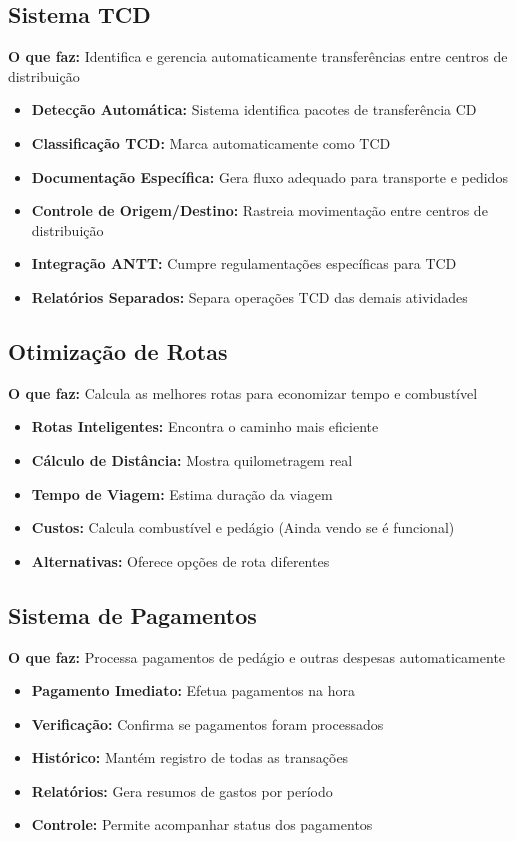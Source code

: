 \documentclass[12pt,a4paper]{article}
\begin{document}
\subsection{Sistema TCD }
\textbf{O que faz:} Identifica e gerencia automaticamente transferências entre centros de distribuição
\begin{itemize}
    \item \textbf{Detecção Automática:} Sistema identifica pacotes de transferência CD
    \item \textbf{Classificação TCD:} Marca automaticamente como TCD
    \item \textbf{Documentação Específica:} Gera fluxo adequado para transporte e pedidos
    \item \textbf{Controle de Origem/Destino:} Rastreia movimentação entre centros de distribuição
    \item \textbf{Integração ANTT:} Cumpre regulamentações específicas para TCD
    \item \textbf{Relatórios Separados:} Separa operações TCD das demais atividades
\end{itemize}

\subsection{Otimização de Rotas}
\textbf{O que faz:} Calcula as melhores rotas para economizar tempo e combustível
\begin{itemize}
    \item \textbf{Rotas Inteligentes:} Encontra o caminho mais eficiente
    \item \textbf{Cálculo de Distância:} Mostra quilometragem real
    \item \textbf{Tempo de Viagem:} Estima duração da viagem
    \item \textbf{Custos:} Calcula combustível e pedágio (Ainda vendo se é funcional)
    \item \textbf{Alternativas:} Oferece opções de rota diferentes
\end{itemize}

\subsection{Sistema de Pagamentos}
\textbf{O que faz:} Processa pagamentos de pedágio e outras despesas automaticamente
\begin{itemize}
    \item \textbf{Pagamento Imediato:} Efetua pagamentos na hora
    \item \textbf{Verificação:} Confirma se pagamentos foram processados
    \item \textbf{Histórico:} Mantém registro de todas as transações
    \item \textbf{Relatórios:} Gera resumos de gastos por período
    \item \textbf{Controle:} Permite acompanhar status dos pagamentos
\end{itemize}
\end{document}
